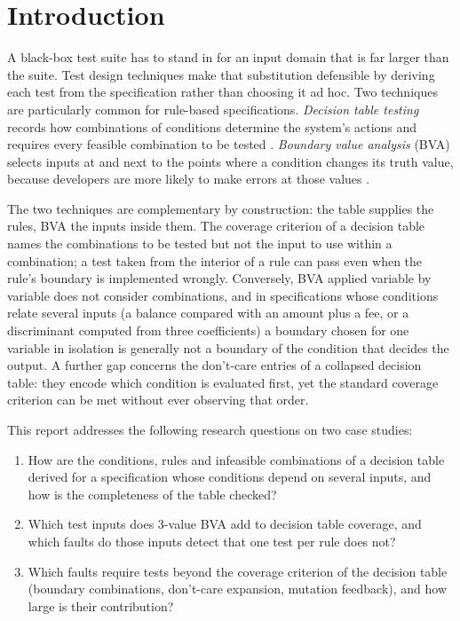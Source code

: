 \documentclass[11pt,a4paper]{article}
\begin{document}
\section{Introduction}
\label{sec:intro}

A black-box test suite has to stand in for an input domain that is far
larger than the suite. Test design techniques make that substitution
defensible by deriving each test from the specification rather than choosing
it ad hoc. Two techniques are particularly common for rule-based
specifications. \emph{Decision table testing} records how combinations of
conditions determine the system's actions and requires every feasible
combination to be tested \cite{jorgensen2021,copeland2004,istqb}.
\emph{Boundary value analysis} (BVA) selects inputs at and next to the
points where a condition changes its truth value, because developers are
more likely to make errors at those values \cite{myers2011,beizer1990,istqb}.

The two techniques are complementary by construction: the table supplies
the rules, BVA the inputs inside them. The coverage criterion of a decision
table names the combinations to be
tested but not the input to use within a combination; a test taken from the
interior of a rule can pass even when the rule's boundary is implemented
wrongly. Conversely, BVA applied variable by variable does not consider
combinations, and in specifications whose conditions relate several inputs
(a balance compared with an amount plus a fee, or a discriminant computed
from three coefficients) a boundary chosen for one variable in isolation is
generally not a boundary of the condition that decides the output. A further
gap concerns the don't-care entries of a collapsed decision table: they
encode which condition is evaluated first, yet the standard coverage
criterion can be met without ever observing that order.

This report addresses the following research questions on two case studies:
\begin{enumerate}[label=\textbf{RQ\arabic*.}]
    \item How are the conditions, rules and infeasible combinations of a
    decision table derived for a specification whose conditions depend on
    several inputs, and how is the completeness of the table checked?
    \item Which test inputs does 3-value BVA add to decision table coverage,
    and which faults do those inputs detect that one test per rule does not?
    \item Which faults require tests beyond the coverage criterion of the
    decision table (boundary combinations, don't-care expansion, mutation
    feedback), and how large is their contribution?
\end{enumerate}
\end{document}
